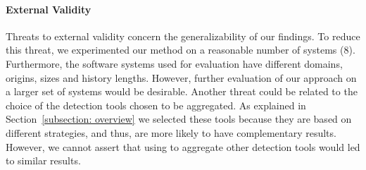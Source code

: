 \paragraph{External Validity} Threats to external validity concern the generalizability of our findings. To reduce this threat, we experimented our method on a reasonable number of systems (8). Furthermore, the software systems used for evaluation have different domains, origins, sizes and history lengths. However, further evaluation of our approach on a larger set of systems would be desirable. Another threat could be related to the choice of the detection tools chosen to be aggregated. As explained in Section~\ref{subsection: overview} we selected these tools because they are based on different strategies, and thus, are more likely to have complementary results. However, we cannot assert that using \NAME{} to aggregate other detection tools would led to similar results.